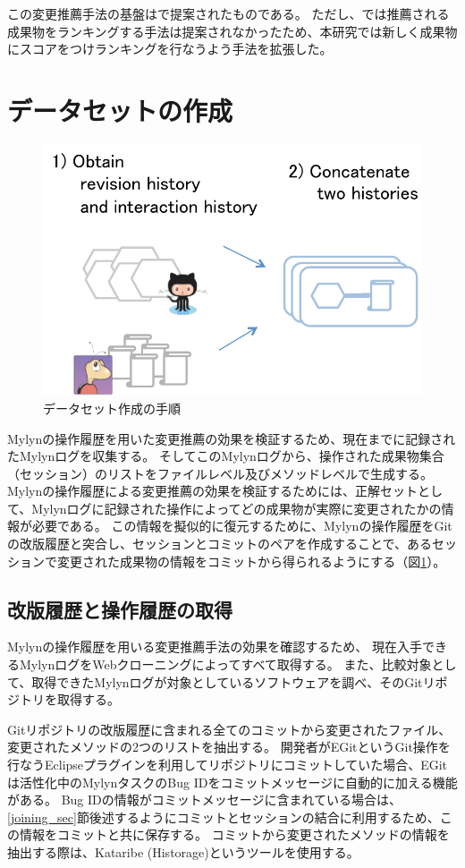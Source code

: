 \documentclass[a4paper]{jsbook}
\begin{document}
この変更推薦手法の基盤は\cite{Zimmermann:2005}で提案されたものである。
ただし、\cite{Zimmermann:2005}では推薦される成果物をランキングする手法は提案されなかったため、本研究では新しく成果物にスコアをつけランキングを行なうよう手法を拡張した。

\section{データセットの作成}\label{data_sec}
\begin{figure}[tb]
  \centering
  \includegraphics[width = 0.7\linewidth]{resource/dataset.pdf}
  \caption{データセット作成の手順}
  \label{dataset}
\end{figure}
Mylynの操作履歴を用いた変更推薦の効果を検証するため、現在までに記録されたMylynログを収集する。
そしてこのMylynログから、操作された成果物集合（セッション）のリストをファイルレベル及びメソッドレベルで生成する。
Mylynの操作履歴による変更推薦の効果を検証するためには、正解セットとして、Mylynログに記録された操作によってどの成果物が実際に変更されたかの情報が必要である。
この情報を擬似的に復元するために、Mylynの操作履歴をGitの改版履歴と突合し、セッションとコミットのペアを作成することで、あるセッションで変更された成果物の情報をコミットから得られるようにする（図\ref{dataset}）。
\subsection{改版履歴と操作履歴の取得}\label{obtainhistory_sec}
Mylynの操作履歴を用いる変更推薦手法の効果を確認するため、
現在入手できるMylynログをWebクローニングによってすべて取得する。
また、比較対象として、取得できたMylynログが対象としているソフトウェアを調べ、そのGitリポジトリを取得する。

Gitリポジトリの改版履歴に含まれる全てのコミットから変更されたファイル、変更されたメソッドの2つのリストを抽出する。
開発者がEGitというGit操作を行なうEclipseプラグインを利用してリポジトリにコミットしていた場合、EGitは活性化中のMylynタスクのBug IDをコミットメッセージに自動的に加える機能がある。
Bug IDの情報がコミットメッセージに含まれている場合は、\ref{joining_sec}節後述するようにコミットとセッションの結合に利用するため、この情報をコミットと共に保存する。
コミットから変更されたメソッドの情報を抽出する際は、Kataribe (Historage)\cite{Hata:2011,Fujiwara:2014}というツールを使用する。
\end{document}
